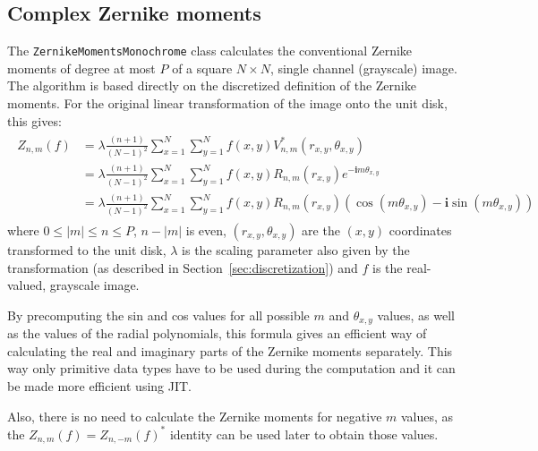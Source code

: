 \subsection{Complex Zernike moments}
The \texttt{ZernikeMomentsMonochrome} class calculates the conventional Zernike moments of degree at most $P$ of a square $N \times N$, single channel (grayscale) image. The algorithm is based directly on the discretized definition of the Zernike moments.
For the original linear transformation of the image onto the unit disk, this gives:
\begin{gather*}
    \begin{split}
    Z_{n,m}(f) &= \lambda\frac{(n+1)}{(N-1)^2}\sum_{x=1}^{N}\sum_{y=1}^{N}f(x,y)V_{n,m}^{*}(r_{x,y},\theta_{x,y}) \\
    &= \lambda\frac{(n+1)}{(N-1)^2}\sum_{x=1}^{N}\sum_{y=1}^{N}f(x,y)R_{n,m}(r_{x,y})e^{-\bm{i}m\theta_{x,y}} \\
    &= \lambda\frac{(n+1)}{(N-1)^2}\sum_{x=1}^{N}\sum_{y=1}^{N}f(x,y)R_{n,m}(r_{x,y})(\cos (m\theta_{x,y}) - \bm{i}\sin (m\theta_{x,y}))
    \end{split}
\end{gather*}
where $0\leq |m| \leq n \leq P$, $n - |m|$ is even, $(r_{x,y},\theta_{x,y})$ are the $(x,y)$ coordinates transformed to the unit disk, $\lambda$ is the scaling parameter also given by the transformation (as described in Section~\ref{sec:discretization}) and $f$ is the real-valued, grayscale image.

By precomputing the sin and cos values for all possible $m$ and $\theta_{x,y}$ values, as well as the values of the radial polynomials, this formula gives an efficient way of calculating the real and imaginary parts of the Zernike moments separately. This way only primitive data types have to be used during the computation and it can be made more efficient using JIT.

Also, there is no need to calculate the Zernike moments for negative $m$ values, as the $Z_{n,m}(f) = Z_{n,-m}(f)^{*}$ identity can be used later to obtain those values.

